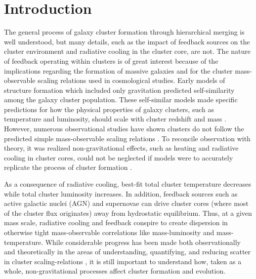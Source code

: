\documentclass{emulateapj}
\begin{document}
\section{Introduction}
\label{sec:intro}

The general process of galaxy cluster formation through hierarchical
merging is well understood, but many details, such as the impact of
feedback sources on the cluster environment and radiative cooling in
the cluster core, are not. The nature of feedback operating within
clusters is of great interest because of the implications regarding
the formation of massive galaxies and for the cluster mass-observable
scaling relations used in cosmological studies. Early models of
structure formation which included only gravitation predicted
self-similarity among the galaxy cluster population. These
self-similar models made specific predictions for how the physical
properties of galaxy clusters, such as temperature and luminosity,
should scale with cluster redshift and mass \citep{kaiser86, kaiser91,
1991ApJ...383...95E, nfw1, nfw2, 1996ApJ...469..494E,
1997MNRAS.292..289E, 1997ApJ...480...36T, 1998ApJ...503..569E,
1998ApJ...495...80B}. However, numerous observational studies have
shown clusters do not follow the predicted simple mass-observable
scaling relations \citep{edge91, 1998MNRAS.297L..57A,
1998ApJ...504...27M, 1999MNRAS.305..631A, 1999ApJ...520...78H,
2000ApJ...536...73N, 2001A&A...368..749F}. To reconcile observation
with theory, it was realized non-gravitational effects, such as
heating and radiative cooling in cluster cores, could not be neglected
if models were to accurately replicate the process of cluster
formation \citep[\eg][]{kaiser91, 1991ApJ...383...95E,
2000ApJ...532...17L, 2002MNRAS.336..409B}.

As a consequence of radiative cooling, best-fit total cluster
temperature decreases while total cluster luminosity increases. In
addition, feedback sources such as active galactic nuclei (AGN) and
supernovae can drive cluster cores (where most of the cluster flux
originates) away from hydrostatic equilibrium. Thus, at a given mass
scale, radiative cooling and feedback conspire to create dispersion in
otherwise tight mass-observable correlations like mass-luminosity and
mass-temperature. While considerable progress has been made both
observationally and theoretically in the areas of understanding,
quantifying, and reducing scatter in cluster scaling-relations
\citep{1996ApJ...458...27B, 2005ApJ...624..606J, kravtsov06, nagai07,
VV08}, it is still important to understand how, taken as a whole,
non-gravitational processes affect cluster formation and evolution.
\end{document}
